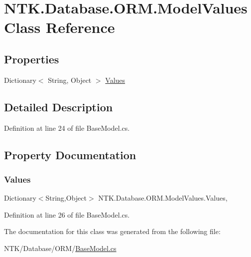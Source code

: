 \hypertarget{class_n_t_k_1_1_database_1_1_o_r_m_1_1_model_values}{}\section{N\+T\+K.\+Database.\+O\+R\+M.\+Model\+Values Class Reference}
\label{class_n_t_k_1_1_database_1_1_o_r_m_1_1_model_values}


 


\subsection*{Properties}
\begin{DoxyCompactItemize}
\item 
Dictionary$<$ String, Object $>$ \mbox{\hyperlink{class_n_t_k_1_1_database_1_1_o_r_m_1_1_model_values_a93de5383140d1798c9ef9a20c1135d14}{Values}}
\end{DoxyCompactItemize}


\subsection{Detailed Description}




Definition at line 24 of file Base\+Model.\+cs.



\subsection{Property Documentation}
\mbox{\label{class_n_t_k_1_1_database_1_1_o_r_m_1_1_model_values_a93de5383140d1798c9ef9a20c1135d14}} 
\subsubsection{\texorpdfstring{Values}{Values}}
{\footnotesize\ttfamily Dictionary$<$String,Object$>$ N\+T\+K.\+Database.\+O\+R\+M.\+Model\+Values.\+Values\hspace{0.3cm}{\ttfamily [get]}, {\ttfamily [set]}}



Definition at line 26 of file Base\+Model.\+cs.



The documentation for this class was generated from the following file\+:\begin{DoxyCompactItemize}
\item 
N\+T\+K/\+Database/\+O\+R\+M/\mbox{\hyperlink{_base_model_8cs}{Base\+Model.\+cs}}\end{DoxyCompactItemize}
